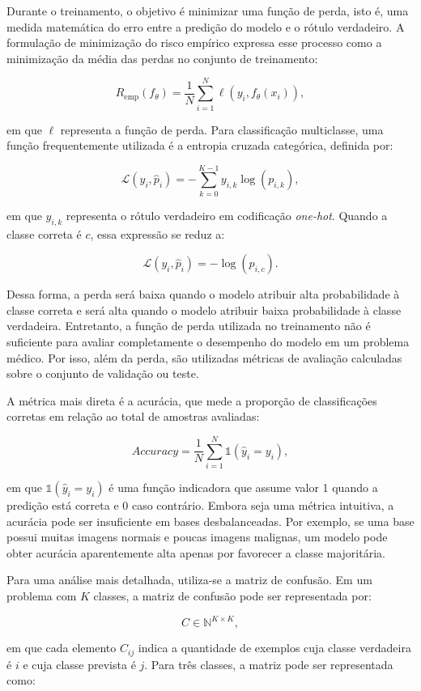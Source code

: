 \documentclass[
    12pt,
    openright,
    oneside,
    a4paper,
    english,
    brazil
]{abntex2}
\begin{document}
Durante o treinamento, o objetivo é minimizar uma função de perda, isto é, uma medida matemática do erro entre a predição do modelo e o rótulo verdadeiro. A formulação de minimização do risco empírico expressa esse processo como a minimização da média das perdas no conjunto de treinamento:

\[
R_{\text{emp}}(f_{\theta}) =
\frac{1}{N}
\sum_{i=1}^{N}
\ell(y_i, f_{\theta}(x_i)),
\]

em que \(\ell\) representa a função de perda. Para classificação multiclasse, uma função frequentemente utilizada é a entropia cruzada categórica, definida por:

\[
\mathcal{L}(y_i, \hat{p}_i) =
-\sum_{k=0}^{K-1} y_{i,k}\log(p_{i,k}),
\]

em que \(y_{i,k}\) representa o rótulo verdadeiro em codificação \textit{one-hot}. Quando a classe correta é \(c\), essa expressão se reduz a:

\[
\mathcal{L}(y_i, \hat{p}_i) = -\log(p_{i,c}).
\]

Dessa forma, a perda será baixa quando o modelo atribuir alta probabilidade à classe correta e será alta quando o modelo atribuir baixa probabilidade à classe verdadeira. Entretanto, a função de perda utilizada no treinamento não é suficiente para avaliar completamente o desempenho do modelo em um problema médico. Por isso, além da perda, são utilizadas métricas de avaliação calculadas sobre o conjunto de validação ou teste.

A métrica mais direta é a acurácia, que mede a proporção de classificações corretas em relação ao total de amostras avaliadas:

\[
Accuracy =
\frac{1}{N}
\sum_{i=1}^{N}
\mathbb{1}(\hat{y}_i = y_i),
\]

em que \(\mathbb{1}(\hat{y}_i = y_i)\) é uma função indicadora que assume valor 1 quando a predição está correta e 0 caso contrário. Embora seja uma métrica intuitiva, a acurácia pode ser insuficiente em bases desbalanceadas. Por exemplo, se uma base possui muitas imagens normais e poucas imagens malignas, um modelo pode obter acurácia aparentemente alta apenas por favorecer a classe majoritária.

Para uma análise mais detalhada, utiliza-se a matriz de confusão. Em um problema com \(K\) classes, a matriz de confusão pode ser representada por:

\[
C \in \mathbb{N}^{K \times K},
\]

em que cada elemento \(C_{ij}\) indica a quantidade de exemplos cuja classe verdadeira é \(i\) e cuja classe prevista é \(j\). Para três classes, a matriz pode ser representada como:
\end{document}
